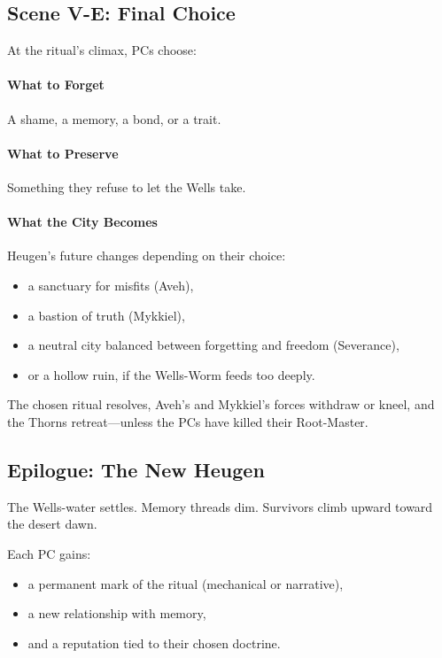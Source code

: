 \documentclass[11pt]{book}
\begin{document}
\subsection*{Scene V-E: Final Choice}

At the ritual's climax, PCs choose:

\paragraph{What to Forget}
A shame, a memory, a bond, or a trait.

\paragraph{What to Preserve}
Something they refuse to let the Wells take.

\paragraph{What the City Becomes}
Heugen's future changes depending on their choice:

\begin{itemize}
    \item a sanctuary for misfits (Aveh),
    \item a bastion of truth (Mykkiel),
    \item a neutral city balanced between forgetting and freedom (Severance),
    \item or a hollow ruin, if the Wells-Worm feeds too deeply.
\end{itemize}

The chosen ritual resolves, Aveh's and Mykkiel's forces withdraw or kneel,
and the Thorns retreat---unless the PCs have killed their Root-Master.

\subsection*{Epilogue: The New Heugen}

The Wells-water settles. Memory threads dim. Survivors climb upward
toward the desert dawn.

Each PC gains:
\begin{itemize}
    \item a permanent mark of the ritual (mechanical or narrative),
    \item a new relationship with memory,
    \item and a reputation tied to their chosen doctrine.
\end{itemize}
\end{document}
